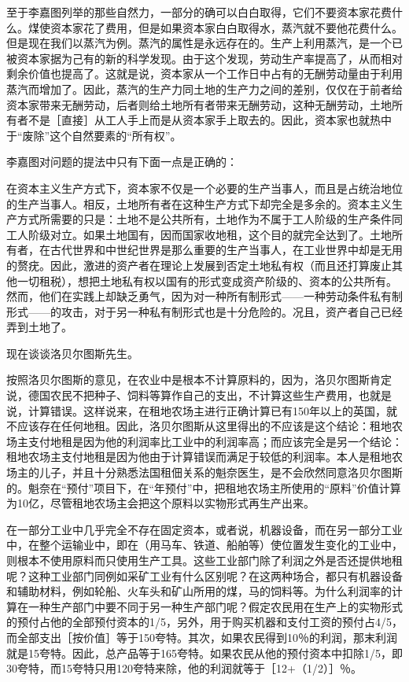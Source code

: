 至于李嘉图列举的那些自然力，一部分的确可以白白取得，它们不要资本家花费什么。煤使资本家花了费用，但是如果资本家白白取得水，蒸汽就不要他花费什么。但是现在我们以蒸汽为例。蒸汽的属性是永远存在的。生产上利用蒸汽，是一个已被资本家据为己有的新的科学发现。由于这个发现，劳动生产率提高了，从而相对剩余价值也提高了。这就是说，资本家从一个工作日中占有的无酬劳动量由于利用蒸汽而增加了。因此，蒸汽的生产力同土地的生产力之间的差别，仅仅在于前者给资本家带来无酬劳动，后者则给土地所有者带来无酬劳动，这种无酬劳动，土地所有者不是［直接］从工人手上而是从资本家手上取去的。因此，资本家也就热中于“废除”这个自然要素的“所有权”。

李嘉图对问题的提法中只有下面一点是正确的：

在资本主义生产方式下，资本家不仅是一个必要的生产当事人，而且是占统治地位的生产当事人。相反，土地所有者在这种生产方式下却完全是多余的。资本主义生产方式所需要的只是：土地不是公共所有，土地作为不属于工人阶级的生产条件同工人阶级对立。如果土地国有，因而国家收地租，这个目的就完全达到了。土地所有者，在古代世界和中世纪世界是那么重要的生产当事人，在工业世界中却是无用的赘疣。因此，激进的资产者在理论上发展到否定土地私有权（而且还打算废止其他一切租税），想把土地私有权以国有的形式变成资产阶级的、资本的公共所有。然而，他们在实践上却缺乏勇气，因为对一种所有制形式——一种劳动条件私有制形式——的攻击，对于另一种私有制形式也是十分危险的。况且，资产者自己已经弄到土地了。


现在谈谈洛贝尔图斯先生。

按照洛贝尔图斯的意见，在农业中是根本不计算原料的，因为，洛贝尔图斯肯定说，德国农民不把种子、饲料等算作自己的支出，不计算这些生产费用，也就是说，计算错误。这样说来，在租地农场主进行正确计算已有150年以上的英国，就不应该存在任何地租。因此，洛贝尔图斯从这里得出的不应该是这个结论：租地农场主支付地租是因为他的利润率比工业中的利润率高；而应该完全是另一个结论：租地农场主支付地租是因为他由于计算错误而满足于较低的利润率。本人是租地农场主的儿子，并且十分熟悉法国租佃关系的魁奈医生，是不会欣然同意洛贝尔图斯的。魁奈在“预付”项目下，在“年预付”中，把租地农场主所使用的“原料”价值计算为10亿，尽管租地农场主会把这个原料以实物形式再生产出来。

在一部分工业中几乎完全不存在固定资本，或者说，机器设备，而在另一部分工业中，在整个运输业中，即在（用马车、铁道、船舶等）使位置发生变化的工业中，则根本不使用原料而只使用生产工具。这些工业部门除了利润之外是否还提供地租呢？这种工业部门同例如采矿工业有什么区别呢？在这两种场合，都只有机器设备和辅助材料，例如轮船、火车头和矿山所用的煤，马的饲料等。为什么利润率的计算在一种生产部门中要不同于另一种生产部门呢？假定农民用在生产上的实物形式的预付占他的全部预付资本的1/5，另外，用于购买机器和支付工资的预付占4/5，而全部支出［按价值］等于150夸特。其次，如果农民得到10％的利润，那末利润就是15夸特。因此，总产品等于165夸特。如果农民从他的预付资本中扣除1/5，即30夸特，而15夸特只用120夸特来除，他的利润就等于［12+（1/2）］％。

